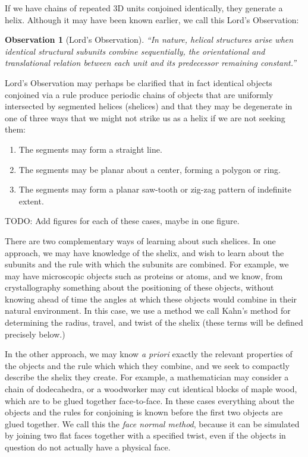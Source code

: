 \documentclass[11pt]{article}
\newtheorem{observation}{Observation}
\begin{document}
{If we have chains of repeated 3D units conjoined identically, they generate a helix.
Although it may have been known earlier, we call this Lord's Observation:

\begin{observation}[Lord's Observation]
  “In nature, helical structures arise when identical structural subunits combine sequentially, the orientational and translational relation between each unit and its predecessor remaining constant.”\cite{lord2002helical}
\end{observation}
Lord's Observation may perhaps be clarified that in fact identical objects conjoined via a rule
produce periodic chains of objects that are uniformly intersected by segmented helices (shelices) and that they may be degenerate in one of
three ways that we might not strike us as a helix if we are not seeking them:
\begin{enumerate}
\item The segments may form a straight line.
\item The segments may be planar about a center, forming a polygon or ring.
\item The segments may form a planar saw-tooth or zig-zag pattern of indefinite extent.
\end{enumerate}

TODO: Add figures for each of these cases, maybe in one figure.

There are two complementary ways of learning about such shelices. In one approach, we may have knowledge of the shelix, and
wish to learn about the subunits and the rule with which the subunits are combined. For example, we may have microscopic objects such as proteins
or atoms, and we know, from crystallography something about the positioning of these objects, without
knowing ahead of time the angles at which these objects would combine in their natural environment.
In this case, we use a method we call Kahn's method\cite{kahn1989defining} for determining the radius, travel, and twist
of the shelix (these terms will be defined precisely below.)

In the other approach, we may know {\it a priori} exactly the
relevant properties of the objects and the rule which which they combine, and we seek to compactly describe the shelix they create.
For example, a mathematician may consider a chain of dodecahedra, or a woodworker may cut identical blocks of maple wood,
which are to be glued together face-to-face. In these cases everything about the objects and the rules for conjoining
is known before the first two objects are glued together. We call this the {\em face normal method}, because
it can be simulated by joining two flat faces together with a specified twist, even if the objects in question
do not actually have a physical face.

}
\end{document}
